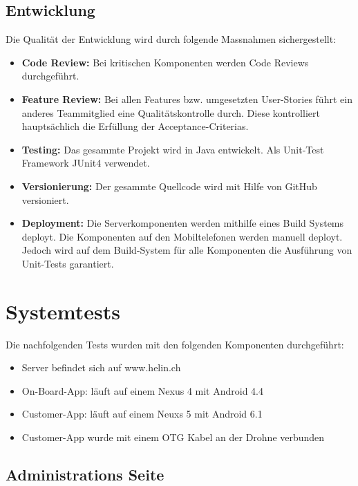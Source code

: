 \subsection{Entwicklung}
Die Qualität der Entwicklung wird durch folgende Massnahmen sichergestellt:
\begin{itemize}
	\item{\textbf{Code Review:} Bei kritischen Komponenten werden Code Reviews durchgeführt.}
	
	\item{\textbf{Feature Review:} Bei allen Features bzw. umgesetzten User-Stories führt ein anderes Teammitglied eine Qualitätskontrolle durch. Diese kontrolliert hauptsächlich die Erfüllung der Acceptance-Criterias.}
	
	\item{\textbf{Testing:} Das gesammte Projekt wird in Java entwickelt. Als Unit-Test Framework JUnit4 verwendet.}
	
	\item{\textbf{Versionierung:} Der gesammte Quellcode wird mit Hilfe von GitHub versioniert.}
	
	\item{\textbf{Deployment:} Die Serverkomponenten werden mithilfe eines Build Systems deployt. Die Komponenten auf den Mobiltelefonen werden manuell deployt. Jedoch wird auf dem Build-System für alle Komponenten die Ausführung von Unit-Tests garantiert.}
	
\end{itemize}

\newpage
\section{Systemtests}	

Die nachfolgenden Tests wurden mit den folgenden Komponenten durchgeführt: 

\begin{itemize}
	\item Server befindet sich auf www.helin.ch
	\item On-Board-App: läuft auf einem Nexus 4 mit Android 4.4
	\item Customer-App: läuft auf einem Neuxs 5 mit Android 6.1
	\item Customer-App wurde mit einem OTG Kabel an der Drohne verbunden
\end{itemize}

\subsection{Administrations Seite}	
